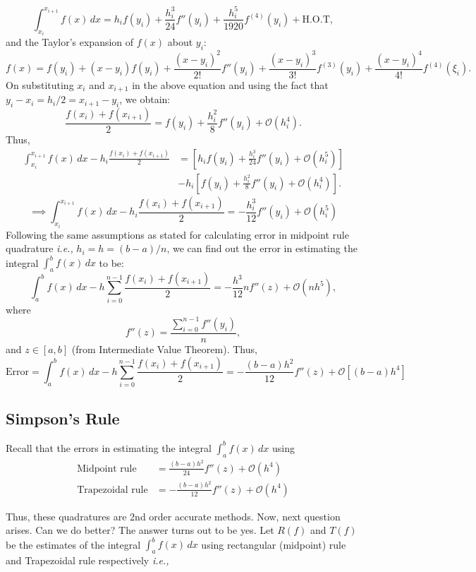 \documentclass[
]{book}
\begin{document}
\[\int_{x_i}^{x_{i+1}} f(x)\, dx = h_i f(y_i) + \frac{h_i^3}{24}f''(y_i)+\frac{h_i^5}{1920}f^{(4)}(y_i)+ \text{H.O.T},\]
and the Taylor's expansion of \(f(x)\) about \(y_i\):
\[f(x) = f(y_i) +(x-y_i)f(y_i) + \frac{(x-y_i)^2}{2!} f''(y_i) + \frac{(x-y_i)^3}{3!} f^{(3)}(y_i)+ \frac{(x-y_i)^4}{4!} f^{(4)}(\xi_i).\]
On substituting \(x_i\) and \(x_{i+1}\) in the above equation and using the fact that \(y_i-x_{i} = h_i/2 = x_{i+1}-y_i\), we obtain:
\[\frac{f(x_i)+f(x_{i+1})}{2} = f(y_i)+\frac{h_i^2}{8}f''(y_i)+ \mathcal{O}(h_i^4).\]
Thus,
\begin{align*}
\int_{x_i}^{x_{i+1}} f(x)\,dx- h_i \frac{f(x_i)+f(x_{i+1})}{2} &= \left[h_if(y_i)+\frac{h_i^3}{24}f''(y_i) +\mathcal{O}(h_i^5)\right] \\
&- h_i\left[f(y_i)+\frac{h_i^2}{8}f''(y_i) +\mathcal{O}(h_i^4)\right].
\end{align*}
\[\implies \int_{x_i}^{x_{i+1}} f(x)\,dx- h_i \frac{f(x_i)+f(x_{i+1})}{2} = -\frac{h_i^3}{12}f''(y_i)+\mathcal{O}(h_i^5)\]
Following the same assumptions as stated for calculating error in midpoint rule quadrature \emph{i.e.,} \(h_i = h = (b-a)/n\), we can find out the error in estimating the integral \(\int_a^b f(x)\, dx\) to be:
\[ \int_{a}^b f(x)\, dx - h\sum_{i=0}^{n-1}\frac{f(x_i)+f(x_{i+1})}{2} = -\frac{h^3}{12} n f''(z) + \mathcal{O}(nh^5),\]
where \[f''(z) = \frac{\sum_{i=0}^{n-1}f''(y_i)}{n},\] and \(z\in[a,b]\) (from Intermediate Value Theorem). Thus,
\begin{equation}
\text{Error} = \int_{a}^b f(x)\, dx - h\sum_{i=0}^{n-1} \frac{f(x_i)+f(x_{i+1})}{2} = -\frac{(b-a)h^2}{12}f''(z) + \mathcal{O}[(b-a)h^4]
\end{equation}

\hypertarget{simpsons-rule}{%
\subsection{Simpson's Rule}\label{simpsons-rule}}

Recall that the errors in estimating the integral \(\int_a^b f(x)\, dx\) using
\begin{align}
\text{Midpoint rule} &= \frac{(b-a)h^2}{24}f''(z)+\mathcal{O}(h^4)\\
\text{Trapezoidal rule} &= -\frac{(b-a)h^2}{12}f''(z) + \mathcal{O}(h^4)
\end{align}

Thus, these quadratures are 2nd order accurate methods. Now, next question arises. Can we do better? The answer turns out to be yes. Let \(R(f)\) and \(T(f)\) be the estimates of the integral \(\int_a^b f(x)\, dx\) using rectangular (midpoint) rule and Trapezoidal rule respectively \emph{i.e.,}
\end{document}
